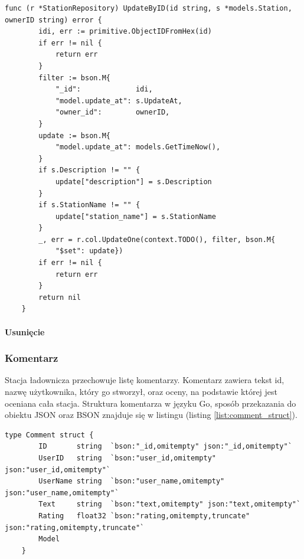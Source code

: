 \begin{lstlisting}[label=list:repo_station_UpdateByID,caption=Edycja stacji ładowniczej w bazie danych,basicstyle=\tiny\ttfamily]
    func (r *StationRepository) UpdateByID(id string, s *models.Station, ownerID string) error {
        idi, err := primitive.ObjectIDFromHex(id)
        if err != nil {
            return err
        }
        filter := bson.M{
            "_id":             idi,
            "model.update_at": s.UpdateAt,
            "owner_id":        ownerID,
        }
        update := bson.M{
            "model.update_at": models.GetTimeNow(),
        }
        if s.Description != "" {
            update["description"] = s.Description
        }
        if s.StationName != "" {
            update["station_name"] = s.StationName
        }
        _, err = r.col.UpdateOne(context.TODO(), filter, bson.M{
            "$set": update})
        if err != nil {
            return err
        }
        return nil
    }
\end{lstlisting}

\paragraph{Usunięcie}
\subsubsection{Komentarz}
Stacja ładownicza przechowuje listę komentarzy. Komentarz zawiera tekst id, nazwę użytkownika, który go stworzył, oraz oceny, na podstawie której jest oceniana cała stacja.
Struktura komentarza w języku Go, sposób przekazania do obiektu JSON oraz BSON znajduje się w listingu (listing \ref{list:comment_struct}).
\begin{lstlisting}[label=list:comment_struct,caption=Struktura komentarza,basicstyle=\tiny\ttfamily]
    type Comment struct {
        ID       string  `bson:"_id,omitempty" json:"_id,omitempty"`
        UserID   string  `bson:"user_id,omitempty" json:"user_id,omitempty"`
        UserName string  `bson:"user_name,omitempty" json:"user_name,omitempty"`
        Text     string  `bson:"text,omitempty" json:"text,omitempty"`
        Rating   float32 `bson:"rating,omitempty,truncate" json:"rating,omitempty,truncate"`
        Model
    }
\end{lstlisting}

